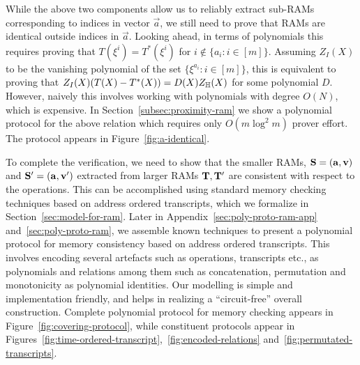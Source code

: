 \smallskip

 While the above two components allow us to reliably extract sub-RAMs
corresponding to indices in vector $\vec{a}$, we still need to prove that RAMs are identical outside indices in
$\vec{a}$. Looking ahead, in terms of polynomials this requires proving that $T(\xi^i)=T^*(\xi^i)$ for $i\not\in
\{a_i:i\in [m]\}$. Assuming $Z_I(X)$ to be the vanishing polynomial of the set $\{\xi^{a_i}:i\in [m]\}$,
this is equivalent to proving that $Z_I(X)(T(X) - T^*(X)) = D(X)Z_\mathbb{H}(X)$ for some polynomial $D$. However, naively
this involves working with polynomials with degree $O(N)$, which is expensive.
In Section~\ref{subsec:proximity-ram} we show a polynomial protocol for the above relation which requires only $O(m\log^2 m)$ prover effort. The protocol
appears in Figure~\ref{fig:a-identical}.

\smallskip

 To complete the verification, we need to show that
the smaller RAMs, $\mathbf{S}=(\mathbf{a},\mathbf{v})$ and $\mathbf{S}'=(\mathbf{a},\mathbf{v}')$ extracted from larger RAMs $\mathbf{T},\mathbf{T}'$
are consistent with respect to the operations. This can be accomplished using standard memory checking techniques
based on address ordered transcripts, which we formalize in Section~\ref{sec:model-for-ram}. Later in
Appendix~\ref{sec:poly-proto-ram-app} and~\ref{sec:poly-proto-ram}, we assemble known techniques to present
a polynomial protocol for memory consistency based on address ordered transcripts.
This involves encoding several artefacts such as operations, transcripts etc., as polynomials and relations
among them such as concatenation, permutation and monotonicity as polynomial identities. Our modelling is
simple and implementation friendly, and helps in realizing a ``circuit-free'' overall construction. Complete
polynomial protocol for memory checking appears in Figure~\ref{fig:covering-protocol}, while constituent protocols
appear in Figures~\ref{fig:time-ordered-transcript},~\ref{fig:encoded-relations} and~\ref{fig:permutated-transcripts}.

\smallskip

